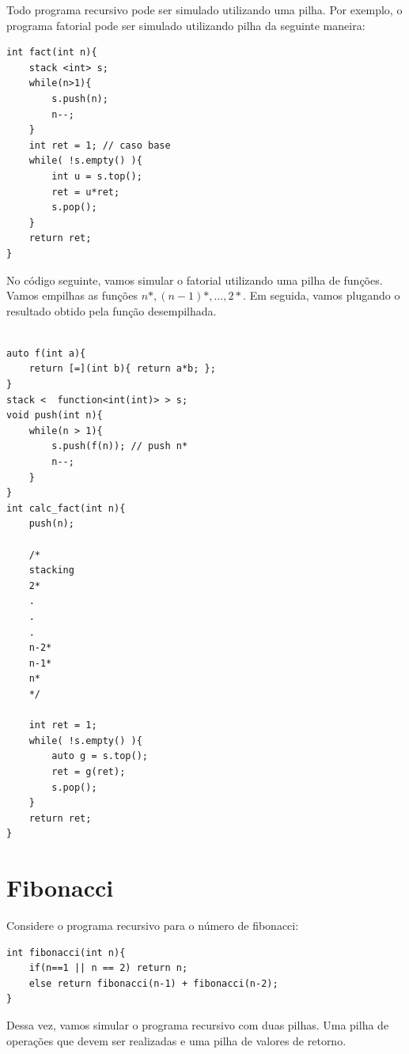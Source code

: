 Todo programa recursivo pode ser simulado utilizando uma pilha. Por exemplo, o programa fatorial pode ser simulado utilizando pilha da seguinte maneira:

\begin{verbatim}
int fact(int n){
    stack <int> s;
    while(n>1){
        s.push(n);
        n--;
    }
    int ret = 1; // caso base
    while( !s.empty() ){
        int u = s.top();
        ret = u*ret;
        s.pop();
    }
    return ret;
}
\end{verbatim}

No código seguinte, vamos simular o fatorial utilizando uma pilha de funções. Vamos empilhas as funções $n*,(n-1)*, \ldots ,2*$. Em seguida, vamos plugando o resultado obtido pela função desempilhada.

\begin{verbatim}

auto f(int a){
    return [=](int b){ return a*b; };
}
stack <  function<int(int)> > s;
void push(int n){
    while(n > 1){
        s.push(f(n)); // push n*
        n--;
    }
}
int calc_fact(int n){
    push(n);
    
    /*
    stacking
    2*
    .
    .
    .
    n-2*
    n-1*
    n*
    */

    int ret = 1;
    while( !s.empty() ){
        auto g = s.top();
        ret = g(ret); 
        s.pop();
    }
    return ret;
}
\end{verbatim}

\section{Fibonacci}

Considere o programa recursivo para o número de fibonacci:

\begin{verbatim}
int fibonacci(int n){
    if(n==1 || n == 2) return n;
    else return fibonacci(n-1) + fibonacci(n-2);
}
\end{verbatim}

Dessa vez, vamos simular o programa recursivo com duas pilhas. Uma pilha de operações que devem ser realizadas e uma pilha de valores de retorno.

